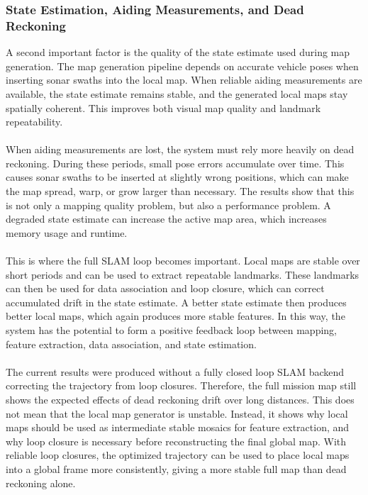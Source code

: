 \subsubsection{State Estimation, Aiding Measurements, and Dead Reckoning}
A second important factor is the quality of the state estimate used during map generation. The map generation pipeline depends on accurate vehicle poses when inserting sonar swaths into the local map. When reliable aiding measurements are available, the state estimate remains stable, and the generated local maps stay spatially coherent. This improves both visual map quality and landmark repeatability.
\\ \\
When aiding measurements are lost, the system must rely more heavily on dead reckoning. During these periods, small pose errors accumulate over time. This causes sonar swaths to be inserted at slightly wrong positions, which can make the map spread, warp, or grow larger than necessary. The results show that this is not only a mapping quality problem, but also a performance problem. A degraded state estimate can increase the active map area, which increases memory usage and runtime.
\\ \\
This is where the full SLAM loop becomes important. Local maps are stable over short periods and can be used to extract repeatable landmarks. These landmarks can then be used for data association and loop closure, which can correct accumulated drift in the state estimate. A better state estimate then produces better local maps, which again produces more stable features. In this way, the system has the potential to form a positive feedback loop between mapping, feature extraction, data association, and state estimation.
\\ \\
The current results were produced without a fully closed loop SLAM backend correcting the trajectory from loop closures. Therefore, the full mission map still shows the expected effects of dead reckoning drift over long distances. This does not mean that the local map generator is unstable. Instead, it shows why local maps should be used as intermediate stable mosaics for feature extraction, and why loop closure is necessary before reconstructing the final global map. With reliable loop closures, the optimized trajectory can be used to place local maps into a global frame more consistently, giving a more stable full map than dead reckoning alone.

